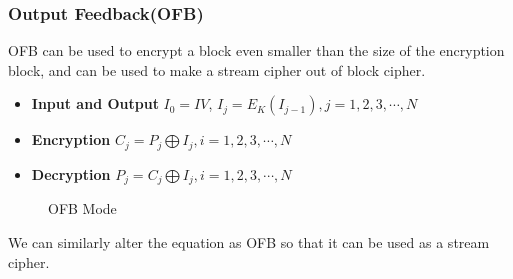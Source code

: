 \documentclass{report}
\begin{document}
			\subsubsection{Output Feedback(OFB)}
				OFB can be used to encrypt a block even smaller than the size of the encryption block, and can be used to make a stream cipher out of block cipher.
				\begin{itemize}
					\item \textbf{Input and Output} $I_0=IV$, $I_j=E_K(I_{j-1}), j=1,2,3,\cdots,N$
					\item \textbf{Encryption} $C_j=P_j \bigoplus I_j, i=1,2,3,\cdots,N$
					\item \textbf{Decryption} $P_j=C_j \bigoplus I_j, i=1,2,3,\cdots,N$
				\end{itemize}
				\begin{figure}[h!]
					\centering
					 \label{fig-OFB-ENC}
					\qquad
					 \label{fig-OFB-DEC}
					\caption{OFB Mode}
					\label{fig-OFB}
				\end{figure}
				We can similarly alter the equation as OFB so that it can be used as a stream cipher.
			
\end{document}
